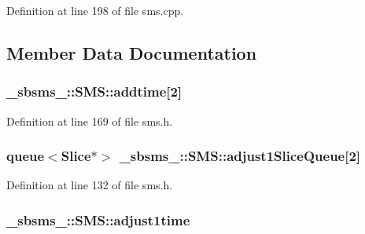 Definition at line 198 of file sms.\+cpp.



\subsection{Member Data Documentation}
\subsubsection[{\texorpdfstring{addtime}{addtime}}]{ \+\_\+sbsms\+\_\+\+::\+S\+M\+S\+::addtime\mbox{[}2\mbox{]}\hspace{0.3cm}{\ttfamily [protected]}}\hypertarget{class__sbsms___1_1_s_m_s_aa1a0a6eb03f1a93deb48f0bb01a94aca}{}\label{class__sbsms___1_1_s_m_s_aa1a0a6eb03f1a93deb48f0bb01a94aca}


Definition at line 169 of file sms.\+h.

\subsubsection[{\texorpdfstring{adjust1\+Slice\+Queue}{adjust1SliceQueue}}]{\setlength{\rightskip}{0pt plus 5cm}queue$<${\bf Slice}$\ast$$>$ \+\_\+sbsms\+\_\+\+::\+S\+M\+S\+::adjust1\+Slice\+Queue\mbox{[}2\mbox{]}\hspace{0.3cm}{\ttfamily [protected]}}\hypertarget{class__sbsms___1_1_s_m_s_aa9df562c88027148365c10728e2eda94}{}\label{class__sbsms___1_1_s_m_s_aa9df562c88027148365c10728e2eda94}


Definition at line 132 of file sms.\+h.

\subsubsection[{\texorpdfstring{adjust1time}{adjust1time}}]{ \+\_\+sbsms\+\_\+\+::\+S\+M\+S\+::adjust1time\hspace{0.3cm}{\ttfamily [protected]}}\hypertarget{class__sbsms___1_1_s_m_s_a41119c7a08f31f37ba05af1e5601e115}{}\label{class__sbsms___1_1_s_m_s_a41119c7a08f31f37ba05af1e5601e115}


